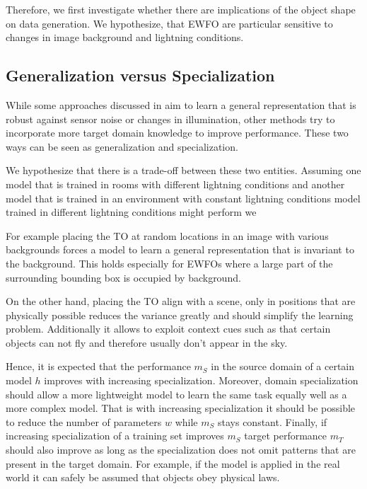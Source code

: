 Therefore, we first investigate whether there are implications of the object shape on data generation. We hypothesize, that \ac{EWFO} are particular sensitive to changes in image background and lightning conditions. 

\subsection{Generalization versus Specialization}
\label{sec:training:genvsspc}

While some approaches discussed in  aim to learn a general representation that is robust against sensor noise or changes in illumination, other methods try to incorporate more target domain knowledge to improve performance. These two ways can be seen as generalization and specialization.

We hypothesize that there is a trade-off between these two entities. Assuming one model that is trained in rooms with different lightning conditions and another model that is trained in an environment with constant lightning conditions model trained in different lightning conditions might perform we

For example placing the \ac{TO} at random locations in an image with various backgrounds forces a model to learn a general representation that is invariant to the background. This holds especially for \acp{EWFO} where a large part of the surrounding bounding box is occupied by background.

On the other hand, placing the \ac{TO} align with a scene, only in positions that are physically possible reduces the variance greatly and should simplify the learning problem. Additionally it allows to exploit context cues such as that certain objects can not fly and therefore usually don't appear in the sky.

Hence, it is expected that the performance $m_{S}$ in the source domain  of a certain model $h$ improves with increasing specialization. Moreover, domain specialization should allow a more lightweight model to learn the same task equally well as a more complex model. That is with increasing specialization it should be possible to reduce the number of parameters $w$ while $m_{S}$ stays constant. Finally, if increasing specialization of a training set improves $m_{S}$ target performance $m_T$ should also improve as long as the specialization does not omit patterns that are present in the target domain. For example, if the model is applied in the real world it can safely be assumed that objects obey physical laws.


